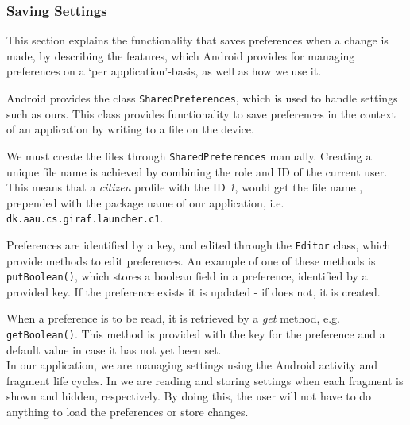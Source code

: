 \subsubsection{Saving Settings}\label{para:sprint4:managingsettingsandroid}
This section explains the functionality that saves preferences when a change is made, by describing the features, which Android provides for managing preferences on a `per application'-basis, as well as how we use it.

Android provides the class \lstinline|SharedPreferences|, which is used to handle settings such as ours.
This class provides functionality to save preferences in the context of an application by writing to a file on the device.

We must create the files through \lstinline|SharedPreferences| manually.
Creating a unique file name is achieved by combining the role and ID of the current user.
This means that a \textit{citizen} profile with the ID \textit{1}, would get the file name , prepended with the package name of our application, i.e. \lstinline|dk.aau.cs.giraf.launcher.c1|.

Preferences are identified by a key, and edited through the \lstinline|Editor| class, which provide methods to edit preferences.
An example of one of these methods is \lstinline!putBoolean()!, which stores a boolean field in a preference, identified by a provided key.
If the preference exists it is updated - if does not, it is created.

When a preference is to be read, it is retrieved by a \textit{get} method, e.g. \lstinline!getBoolean()!.
This method is provided with the key for the preference and a default value in case it has not yet been set.\\

In our application, we are managing settings using the Android activity and fragment life cycles.
In \settingsactivity we are reading and storing settings when each fragment is shown and hidden, respectively. 
By doing this, the user will not have to do anything to load the preferences or store changes.
